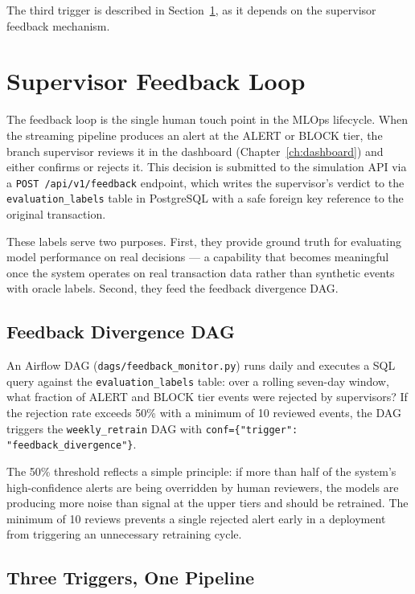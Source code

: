 The third trigger is described in Section~\ref{sec:feedback-loop}, as it
depends on the supervisor feedback mechanism.


\section{Supervisor Feedback Loop}
\label{sec:feedback-loop}

The feedback loop is the single human touch point in the MLOps lifecycle.
When the streaming pipeline produces an alert at the ALERT or BLOCK tier,
the branch supervisor reviews it in the dashboard
(Chapter~\ref{ch:dashboard}) and either confirms or rejects it. This
decision is submitted to the simulation API via a
\texttt{POST /api/v1/feedback} endpoint, which writes the supervisor's
verdict to the \texttt{evaluation\_labels} table in PostgreSQL with a
safe foreign key reference to the original transaction.

These labels serve two purposes. First, they provide ground truth for
evaluating model performance on real decisions --- a capability that
becomes meaningful once the system operates on real transaction data
rather than synthetic events with oracle labels. Second, they feed the
feedback divergence DAG.

\subsection{Feedback Divergence DAG}

An Airflow DAG (\texttt{dags/feedback\_monitor.py}) runs daily and executes
a SQL query against the \texttt{evaluation\_labels} table: over a rolling
seven-day window, what fraction of ALERT and BLOCK tier events were
rejected by supervisors? If the rejection rate exceeds 50\% with a minimum
of 10 reviewed events, the DAG triggers the \texttt{weekly\_retrain} DAG
with \texttt{conf=\{"trigger": "feedback\_divergence"\}}.

The 50\% threshold reflects a simple principle: if more than half of the
system's high-confidence alerts are being overridden by human reviewers,
the models are producing more noise than signal at the upper tiers and
should be retrained. The minimum of 10 reviews prevents a single rejected
alert early in a deployment from triggering an unnecessary retraining
cycle.

\subsection{Three Triggers, One Pipeline}

